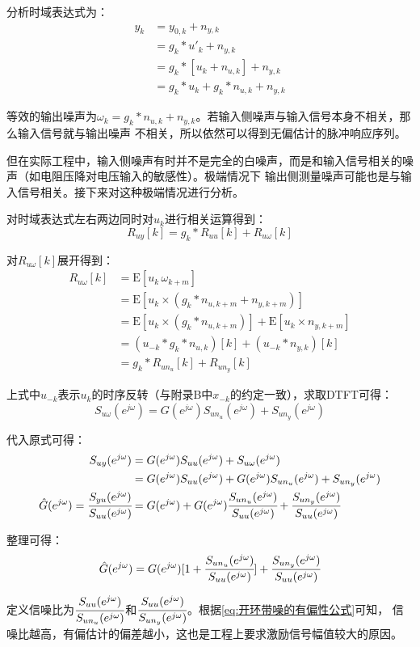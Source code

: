 分析时域表达式为：
\begin{align*}
    y_k&=y_{0,k}+n_{y,k}\\
    &=g_k*u'_k+n_{y,k}\\
    &=g_k*[u_k+n_{u,k}]+n_{y,k}\\
    &=g_k*u_k+g_k*n_{u,k}+n_{y,k}
\end{align*}

等效的输出噪声为\(\omega_k = g_k*n_{u,k}+n_{y,k}\)。若输入侧噪声与输入信号本身不相关，那么输入信号就与输出噪声
不相关，所以依然可以得到无偏估计的脉冲响应序列。

但在实际工程中，输入侧噪声有时并不是完全的白噪声，而是和输入信号相关的噪声（如电阻压降对电压输入的敏感性）。极端情况下
输出侧测量噪声可能也是与输入信号相关。接下来对这种极端情况进行分析。

对时域表达式左右两边同时对\(u_k\)进行相关运算得到：
\begin{equation*}
    R_{uy}[k]=g_k*R_{uu}[k]+R_{u\omega}[k]
\end{equation*}

对\(R_{u\omega}[k]\)展开得到：
\begin{align*}
    R_{u\omega}[k] &= \text{E}[u_k\,\omega_{k+m}]\\
    &= \text{E}[u_k\times(g_k*n_{u,k+m}+n_{y,k+m})]\\
    &= \text{E}[u_k\times(g_k*n_{u,k+m})]+\text{E}[u_k\times n_{y,k+m}]\\
    &= (u_{-k}*g_k*n_{u,k})[k]+(u_{-k}*n_{y,k})[k]\\
    &= g_k*R_{un_u}[k]+R_{un_y}[k]
\end{align*}

上式中\(u_{-k}\)表示\(u_k\)的时序反转（与附录B中\(x_{-k}\)的约定一致），求取DTFT可得：
\begin{equation*}
    S_{u\omega}(e^{j\omega})=G(e^{j\omega})S_{un_u}(e^{j\omega})+S_{un_y}(e^{j\omega})
\end{equation*}

代入原式可得：
\begin{align*}
    S_{uy}(e^{j\omega})&=G(e^{j\omega})S_{uu}(e^{j\omega})+S_{u\omega}(e^{j\omega})\\
    &= G(e^{j\omega})S_{uu}(e^{j\omega})+G(e^{j\omega})S_{un_u}(e^{j\omega})+S_{un_y}(e^{j\omega})\\
    \hat{G}(e^{j\omega})=\cfrac{S_{yu}(e^{j\omega})}{S_{uu}(e^{j\omega})}&=G(e^{j\omega})+G(e^{j\omega})\cfrac{S_{un_u}(e^{j\omega})}{S_{uu}(e^{j\omega})}+\cfrac{S_{un_y}(e^{j\omega})}{S_{uu}(e^{j\omega})}
\end{align*}

整理可得：
\begin{equation}
    \hat{G}(e^{j\omega})=G(e^{j\omega})[1+\cfrac{S_{un_u}(e^{j\omega})}{S_{uu}(e^{j\omega})}]+\cfrac{S_{un_y}(e^{j\omega})}{S_{uu}(e^{j\omega})}
    \label{eq:开环带噪的有偏性公式}
\end{equation}

定义信噪比为\(\cfrac{S_{uu}(e^{j\omega})}{S_{un_u}(e^{j\omega})}\)和\(\cfrac{S_{uu}(e^{j\omega})}{S_{un_y}(e^{j\omega})}\)。根据\ref{eq:开环带噪的有偏性公式}可知，
信噪比越高，有偏估计的偏差越小，这也是工程上要求激励信号幅值较大的原因。
